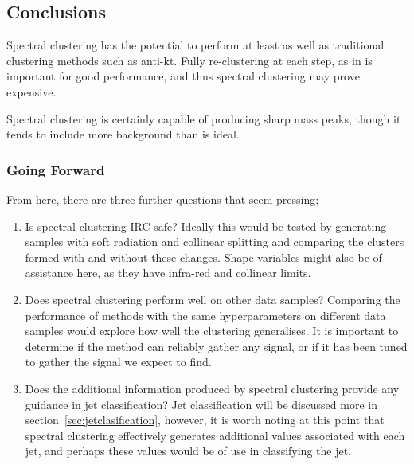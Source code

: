 \subsection{Conclusions}
Spectral clustering has the potential to perform at least as well as 
traditional clustering methods such as anti-kt.
Fully re-clustering at each step, as in \spectralfulljet{} is important for good performance,
and thus spectral clustering may prove expensive.

Spectral clustering is certainly capable of producing sharp mass peaks,
though it tends to include more background than is ideal.

\subsubsection{Going Forward}
From here, there are three further questions that seem pressing;
\begin{enumerate}
    \item Is spectral clustering IRC safe? Ideally this would be tested 
        by generating samples with soft radiation and collinear splitting
        and comparing the clusters formed with and without these changes.
        Shape variables might also be of assistance here, as they have
        infra-red and collinear limits.
    \item Does spectral clustering perform well on other data samples?
        Comparing the performance of methods with the same hyperparameters on
        different data samples would explore how well the clustering generalises.
        It is important to determine if the method can reliably gather
        any signal, or if it has been tuned to gather the signal we expect to find.
    \item Does the additional information produced by spectral clustering 
        provide any guidance in jet classification?
        Jet classification will be discussed more in section~\ref{sec:jetclasification},
        however, it is worth noting at this point that spectral clustering
        effectively generates additional values associated with each jet,
        and perhaps these values would be of use in classifying the jet.
\end{enumerate}

